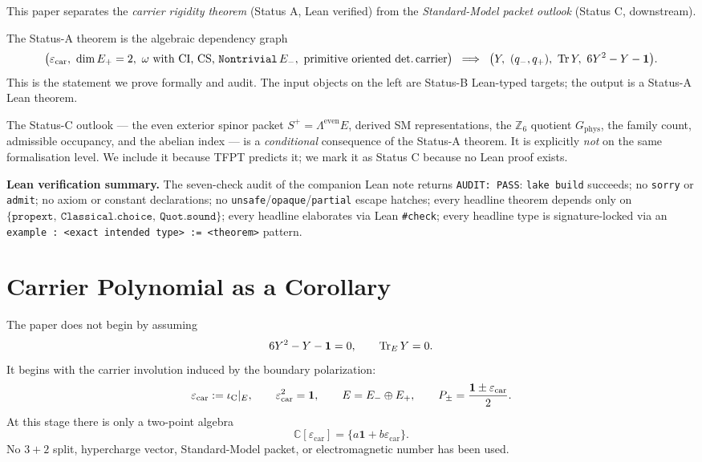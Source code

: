 \documentclass[11pt,a4paper]{article}
\begin{document}
This paper separates the \emph{carrier rigidity theorem}
(Status A, Lean verified) from the \emph{Standard-Model packet
outlook} (Status C, downstream).

The Status-A theorem is the algebraic dependency graph
\[
\big(\varepsilon_{\mathrm{car}},\ \dim E_+ = 2,\ \omega \text{ with CI, CS, } \texttt{Nontrivial}\,E_-,\ \text{primitive oriented det.\,carrier}\big)
\;\;\Longrightarrow\;\;
\big(Y,\ (q_-, q_+),\ \operatorname{Tr} Y,\ 6 Y^2 - Y - \mathbf 1\big).
\]
This is the statement we prove formally and audit. The
input objects on the left are Status-B Lean-typed targets;
the output is a Status-A Lean theorem.

The Status-C outlook --- the even exterior spinor packet
$S^+ = \Lambda^{\mathrm{even}} E$, derived SM representations,
the $\mathbb Z_6$ quotient $G_{\mathrm{phys}}$, the family
count, admissible occupancy, and the abelian index --- is a
\emph{conditional} consequence of the Status-A theorem. It is
explicitly \emph{not} on the same formalisation level. We
include it because TFPT predicts it; we mark it as Status C
because no Lean proof exists.

\noindent
\textbf{Lean verification summary.}
The seven-check audit of the companion Lean note returns
\texttt{AUDIT:~PASS}: \texttt{lake build} succeeds; no
\texttt{sorry} or \texttt{admit}; no axiom or constant
declarations; no \texttt{unsafe}/\texttt{opaque}/\texttt{partial}
escape hatches; every headline theorem depends only on
$\{\texttt{propext},\ \texttt{Classical.choice},\ \texttt{Quot.sound}\}$;
every headline elaborates via Lean \texttt{\#check}; every
headline type is signature-locked via an
\texttt{example : <exact intended type> := <theorem>} pattern.

\section{Carrier Polynomial as a Corollary}

The paper does not begin by assuming
\[
6Y^2-Y-\mathbf 1=0,\qquad \operatorname{Tr}_EY=0.
\]
It begins with the carrier involution induced by the boundary polarization:
\[
\varepsilon_{\mathrm{car}}:=\iota_{\mathrm C}|_E,
\qquad
\varepsilon_{\mathrm{car}}^2=\mathbf 1,
\qquad
E=E_-\oplus E_+,
\qquad
P_\pm=\frac{\mathbf 1\pm\varepsilon_{\mathrm{car}}}{2}.
\]
At this stage there is only a two-point algebra
\[
\mathbb C[\varepsilon_{\mathrm{car}}]=\{a\mathbf 1+b\varepsilon_{\mathrm{car}}\}.
\]
No $3+2$ split, hypercharge vector, Standard-Model packet, or electromagnetic number has been
used.
\end{document}
